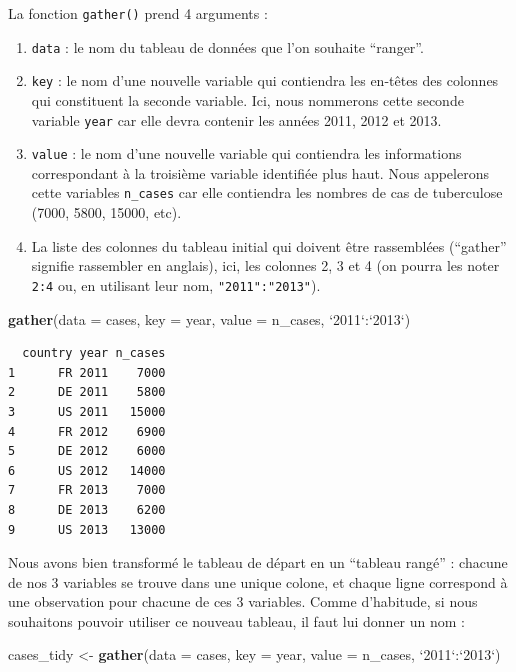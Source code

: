 \documentclass[a4paperpaper,]{article}
\newenvironment{Shaded}{\begin{snugshade}}{\end{snugshade}}
\newcommand{\DataTypeTok}[1]{\textcolor[rgb]{0.00,0.34,0.68}{#1}}
\newcommand{\KeywordTok}[1]{\textcolor[rgb]{0.12,0.11,0.11}{\textbf{#1}}}
\newcommand{\NormalTok}[1]{\textcolor[rgb]{0.12,0.11,0.11}{#1}}
\newcommand{\OperatorTok}[1]{\textcolor[rgb]{0.12,0.11,0.11}{#1}}
\newcommand{\StringTok}[1]{\textcolor[rgb]{0.75,0.01,0.01}{#1}}
\providecommand{\tightlist}{%
  \setlength{\itemsep}{0pt}\setlength{\parskip}{0pt}}
\begin{document}
La fonction \texttt{gather()} prend 4 arguments :

\begin{enumerate}
\def\labelenumi{\arabic{enumi}.}
\tightlist
\item
  \texttt{data} : le nom du tableau de données que l'on souhaite ``ranger''.
\item
  \texttt{key} : le nom d'une nouvelle variable qui contiendra les en-têtes des colonnes qui constituent la seconde variable. Ici, nous nommerons cette seconde variable \texttt{year} car elle devra contenir les années 2011, 2012 et 2013.
\item
  \texttt{value} : le nom d'une nouvelle variable qui contiendra les informations correspondant à la troisième variable identifiée plus haut. Nous appelerons cette variables \texttt{n\_cases} car elle contiendra les nombres de cas de tuberculose (7000, 5800, 15000, etc).
\item
  La liste des colonnes du tableau initial qui doivent être rassemblées (``gather'' signifie rassembler en anglais), ici, les colonnes 2, 3 et 4 (on pourra les noter \texttt{2:4} ou, en utilisant leur nom, \texttt{"2011":"2013"}).
\end{enumerate}

\begin{Shaded}
\begin{Highlighting}[]
\KeywordTok{gather}\NormalTok{(}\DataTypeTok{data =}\NormalTok{ cases, }\DataTypeTok{key =}\NormalTok{ year, }\DataTypeTok{value =}\NormalTok{ n_cases, }\StringTok{`}\DataTypeTok{2011}\StringTok{`}\OperatorTok{:}\StringTok{`}\DataTypeTok{2013}\StringTok{`}\NormalTok{)}
\end{Highlighting}
\end{Shaded}

\begin{verbatim}
  country year n_cases
1      FR 2011    7000
2      DE 2011    5800
3      US 2011   15000
4      FR 2012    6900
5      DE 2012    6000
6      US 2012   14000
7      FR 2013    7000
8      DE 2013    6200
9      US 2013   13000
\end{verbatim}

Nous avons bien transformé le tableau de départ en un ``tableau rangé'' : chacune de nos 3 variables se trouve dans une unique colone, et chaque ligne correspond à une observation pour chacune de ces 3 variables. Comme d'habitude, si nous souhaitons pouvoir utiliser ce nouveau tableau, il faut lui donner un nom :

\begin{Shaded}
\begin{Highlighting}[]
\NormalTok{cases_tidy <-}\StringTok{ }\KeywordTok{gather}\NormalTok{(}\DataTypeTok{data =}\NormalTok{ cases, }\DataTypeTok{key =}\NormalTok{ year, }\DataTypeTok{value =}\NormalTok{ n_cases, }\StringTok{`}\DataTypeTok{2011}\StringTok{`}\OperatorTok{:}\StringTok{`}\DataTypeTok{2013}\StringTok{`}\NormalTok{)}
\end{Highlighting}
\end{Shaded}
\end{document}
